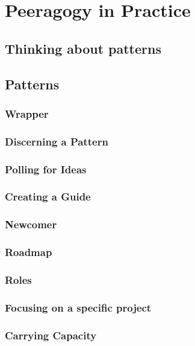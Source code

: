 \documentclass[ebook, 12pt, twoside]{memoir}
\begin{document}
\part{Peeragogy in Practice} \label{practice-part}  %
%
\chapter[\textbf{Thinking about patterns}]{Thinking about patterns}

%
\chapter[\textbf{Patterns}]{ Patterns }

\section*{Wrapper}

\section*{Discerning a Pattern}

\section*{Polling for Ideas}

\section*{Creating a Guide}

\section*{Newcomer}

\section*{Roadmap}

\section*{Roles}

\section*{Focusing on a specific project}

\section*{Carrying Capacity}

\end{document}
